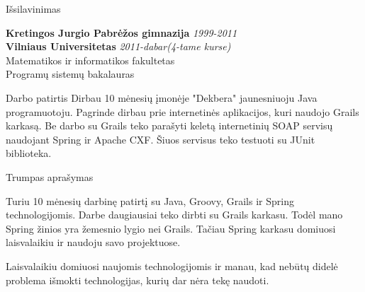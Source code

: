 \documentclass[]{resume} %
\begin{document}

\begin{rSection}{Išsilavinimas}

{\bf Kretingos Jurgio Pabrėžos gimnazija} \hfill {\em 1999-2011} \\
{\bf Vilniaus Universitetas} \hfill {\em 2011-dabar(4-tame kurse)} \\
Matematikos ir informatikos fakultetas\\
Programų sistemų bakalauras\\

\end{rSection}

\begin{rSection}{Darbo patirtis}
Dirbau 10 mėnesių įmonėje "Dekbera" jaunesniuoju Java programuotoju.
Pagrinde dirbau prie internetinės aplikacijos, kuri naudojo Grails karkasą.
Be darbo su Grails teko parašyti keletą internetinių SOAP servisų naudojant Spring ir Apache CXF.
Šiuos servisus teko testuoti su JUnit biblioteka.
\end{rSection}

\begin{rSection}{Trumpas aprašymas}

Turiu 10 mėnesių darbinę patirtį su Java, Groovy, Grails ir Spring technologijomis.
Darbe daugiausiai teko dirbti su Grails karkasu. Todėl mano Spring žinios yra žemesnio
lygio nei Grails. Tačiau Spring karkasu domiuosi laisvalaikiu ir naudoju savo projektuose.

Laisvalaikiu domiuosi naujomis technologijomis ir manau, kad nebūtų didelė problema
išmokti technologijas, kurių dar nėra tekę naudoti.
\end{rSection}

\end{document}
